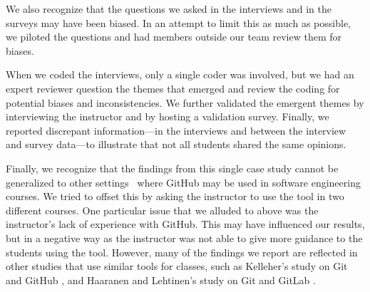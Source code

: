 We also recognize that the questions we asked in the interviews and in the surveys may have been biased. In an attempt to limit this as much as possible, we piloted the questions and had members outside our team review them for biases.

When we coded the interviews, only a single coder was involved, but we had an expert reviewer question the themes that emerged and review the coding for potential biases and inconsistencies. We further validated the emergent themes by interviewing the instructor and by hosting a validation survey. Finally, we reported discrepant information---in the interviews and between the interview and survey data---to illustrate that not all students shared the same opinions.

Finally, we recognize that the findings from this single case study cannot be generalized to other settings~\cite{runeson2012case} where GitHub may be used in software engineering courses. We tried to offset this by asking the instructor to use the tool in two different courses. One particular issue that we alluded to above was the instructor's lack of experience with GitHub. This may have influenced our results, but in a negative way as the instructor was not able to give more guidance to the students using the tool. However, many of the findings we report are reflected in other studies that use similar tools for classes, such as Kelleher's study on Git and GitHub \cite{kelleher2014employing}, and Haaranen and Lehtinen's study on Git and GitLab \cite{haaranen2015teaching}.
